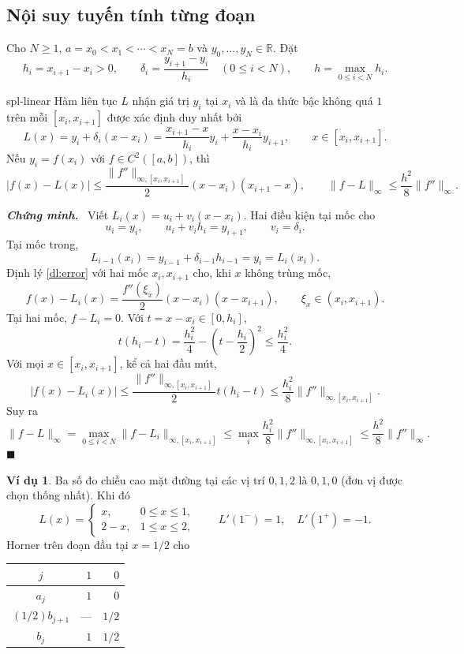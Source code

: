 \documentclass[12pt,a4paper,oneside]{book}
\numberwithin{algorithm}{chapter}
\theoremstyle{definition}
\newtheorem{vidu}{Ví dụ}[chapter]
\newenvironment{chungminh}{\par\medskip\noindent\textbf{\textit{\color{mainblue}Chứng minh.}}\ }{\hfill$\blacksquare$\par\medskip}
\newcommand{\R}{\mathbb{R}}
\begin{document}
\subsection{Nội suy tuyến tính từng đoạn}
Cho $N\geq1$, $a=x_0<x_1<\cdots<x_N=b$ và $y_0,\ldots,y_N\in\R$. Đặt
\[
 h_i=x_{i+1}-x_i>0,\qquad \delta_i=\frac{y_{i+1}-y_i}{h_i}\quad(0\leq i<N),\qquad h=\max_{0\leq i<N}h_i.
\]
\begin{dinhly}{}{spl-linear}
Hàm liên tục $L$ nhận giá trị $y_i$ tại $x_i$ và là đa thức bậc không quá $1$ trên mỗi $[x_i,x_{i+1}]$ được xác định duy nhất bởi
\begin{equation}\label{eq:spl-linear}
 L(x)=y_i+\delta_i(x-x_i)
 =\frac{x_{i+1}-x}{h_i}y_i+\frac{x-x_i}{h_i}y_{i+1},\qquad x\in[x_i,x_{i+1}].
\end{equation}
Nếu $y_i=f(x_i)$ với $f\in C^2([a,b])$, thì
\[
 |f(x)-L(x)|\leq\frac{\|f''\|_{\infty,[x_i,x_{i+1}]}}2(x-x_i)(x_{i+1}-x),\qquad
 \|f-L\|_\infty\leq\frac{h^2}8\|f''\|_\infty.
\]
\end{dinhly}
\begin{chungminh}
Viết $L_i(x)=u_i+v_i(x-x_i)$. Hai điều kiện tại mốc cho
\[
 u_i=y_i,\qquad u_i+v_ih_i=y_{i+1},\qquad v_i=\delta_i.
\]
Tại mốc trong,
\[
 L_{i-1}(x_i)=y_{i-1}+\delta_{i-1}h_{i-1}=y_i=L_i(x_i).
\]
Định lý \ref{dl:error} với hai mốc $x_i,x_{i+1}$ cho, khi $x$ không trùng mốc,
\[
 f(x)-L_i(x)=\frac{f''(\xi_x)}2(x-x_i)(x-x_{i+1}),\qquad \xi_x\in(x_i,x_{i+1}).
\]
Tại hai mốc, $f-L_i=0$. Với $t=x-x_i\in[0,h_i]$,
\[
 t(h_i-t)=\frac{h_i^2}4-\left(t-\frac{h_i}2\right)^2\leq\frac{h_i^2}4.
\]
Với mọi $x\in[x_i,x_{i+1}]$, kể cả hai đầu mút,
\[
 |f(x)-L_i(x)|
 \leq\frac{\|f''\|_{\infty,[x_i,x_{i+1}]}}2t(h_i-t)
 \leq\frac{h_i^2}8\|f''\|_{\infty,[x_i,x_{i+1}]}.
\]
Suy ra
\[
 \|f-L\|_\infty
 =\max_{0\leq i<N}\|f-L_i\|_{\infty,[x_i,x_{i+1}]}
 \leq\max_i\frac{h_i^2}8\|f''\|_{\infty,[x_i,x_{i+1}]}
 \leq\frac{h^2}8\|f''\|_\infty.
\]
\end{chungminh}
\begin{vidu}
Ba số đo chiều cao mặt đường tại các vị trí $0,1,2$ là $0,1,0$ (đơn vị được chọn thống nhất). Khi đó
\[
 L(x)=\begin{cases}x,&0\leq x\leq1,\\2-x,&1\leq x\leq2,\end{cases}\qquad
 L'(1^-)=1,\quad L'(1^+)=-1.
\]
Horner trên đoạn đầu tại $x=1/2$ cho
\begin{center}\begin{tabular}{c|rr}\toprule
$j$&$1$&$0$\\\midrule
$a_j$&$1$&$0$\\
$(1/2)b_{j+1}$&---&$1/2$\\\midrule
$b_j$&$1$&$\boxed{1/2}$\\\bottomrule
\end{tabular}\end{center}
\end{vidu}
\end{document}
